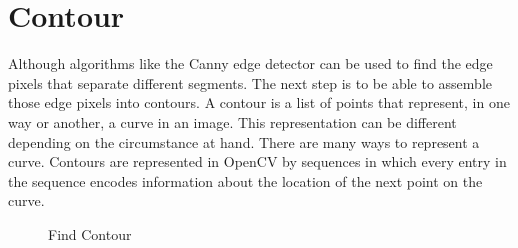 \section{Contour}
Although algorithms like the Canny edge detector can be used to find the edge pixels that separate different segments. The next step is to be able to assemble those edge pixels into contours.
A contour is a list of points that represent, in one way or another, a curve in an image. This representation can be different depending on the circumstance at hand. There are many ways to represent a curve. Contours are represented in OpenCV by sequences in which every entry in the sequence encodes information about the location of the next point on the curve.

\begin{figure}[H]
\centering
{}
\caption {Find Contour}
\label {fig:ContourDetection}
\end{figure}